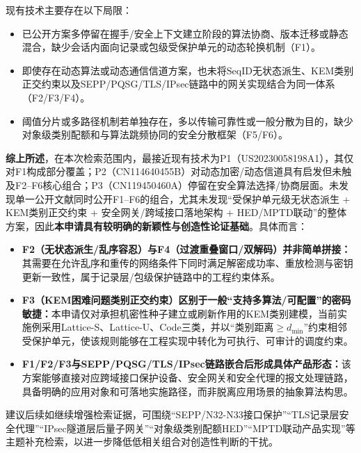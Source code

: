 ﻿\documentclass[12pt,a4paper]{article}
\newcommand{\SeqID}{\mathrm{SeqID}}
\begin{document}
现有技术主要存在以下局限：

\begin{itemize}[leftmargin=2em]
    \item 已公开方案多停留在握手/安全上下文建立阶段的算法协商、版本迁移或静态混合，缺少会话内面向记录或包级受保护单元的动态轮换机制（F1）。
    \item 即使存在动态算法或动态通信信道方案，也未将$\SeqID$无状态派生、KEM类别正交约束以及SEPP/PQSG/TLS/IPsec链路中的网关实现结合为同一体系（F2/F3/F4）。
    \item 阈值分片或多路径机制若单独存在，多以传输可靠性或一般分散为目的，缺少对象级类别配额和与算法跳频协同的安全分散框架（F5/F6）。
\end{itemize}

    \textbf{综上所述}，在本次检索范围内，最接近现有技术为P1（US20230058198A1），其仅对F1构成部分覆盖；P2（CN114640455B）对动态加密/动态信道具有启发但未触及F2--F6核心组合；P3（CN119450460A）停留在安全算法选择/协商层面。未发现单一公开文献同时公开F1--F6的组合，尤其未发现“受保护单元级无状态派生 + KEM类别正交约束 + 安全网关/跨域接口落地架构 + HED/MPTD联动”的整体方案，因此\textbf{本申请具有较明确的新颖性与创造性论证基础}。具体而言：

\begin{itemize}[leftmargin=2em]
    \item \textbf{F2（无状态派生/乱序容忍）与F4（过渡重叠窗口/双解码）并非简单拼接：}其需要在允许乱序和重传的网络条件下同时满足解密成功率、重放检测与密钥更新一致性，属于记录层/包级保护链路中的工程约束体系。
    \item \textbf{F3（KEM困难问题类别正交约束）区别于一般“支持多算法/可配置”的密码敏捷：}本申请仅对承担机密性种子建立或刷新作用的KEM类别建模，当前实施例采用Lattice-S、Lattice-U、Code三类，并以“类别距离$\ge d_{\min}$”约束相邻受保护单元，使该规则能够在工程实现中转化为可执行、可审计的调度约束。
    \item \textbf{F1/F2/F3与SEPP/PQSG/TLS/IPsec链路嵌合后形成具体产品形态：}该方案能够直接对应跨域接口保护设备、安全网关和安全代理的报文处理链路，具备明确的应用对象和可落地实施路径，而非脱离应用场景的抽象算法构思。
\end{itemize}

建议后续如继续增强检索证据，可围绕“SEPP/N32-N33接口保护”“TLS记录层安全代理”“IPsec隧道层后量子网关”“对象级类别配额HED”“MPTD联动产品实现”等主题补充检索，以进一步降低低相关组合对创造性判断的干扰。
\end{document}
